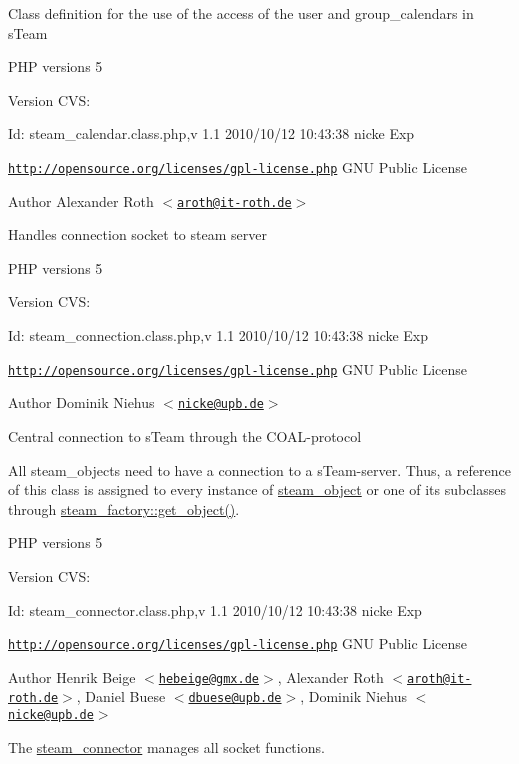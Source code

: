 Class definition for the use of the access of the user and group\_\-calendars in sTeam

PHP versions 5

\begin{DoxyVersion}{Version}
CVS: 
\end{DoxyVersion}
\begin{DoxyParagraph}{Id:}
steam\_\-calendar.class.php,v 1.1 2010/10/12 10:43:38 nicke Exp 
\end{DoxyParagraph}


\href{http://opensource.org/licenses/gpl-license.php}{\tt http://opensource.org/licenses/gpl-\/license.php} GNU Public License \begin{DoxyAuthor}{Author}
Alexander Roth $<$\href{mailto:aroth@it-roth.de}{\tt aroth@it-\/roth.de}$>$
\end{DoxyAuthor}
Handles connection socket to steam server

PHP versions 5

\begin{DoxyVersion}{Version}
CVS: 
\end{DoxyVersion}
\begin{DoxyParagraph}{Id:}
steam\_\-connection.class.php,v 1.1 2010/10/12 10:43:38 nicke Exp 
\end{DoxyParagraph}


\href{http://opensource.org/licenses/gpl-license.php}{\tt http://opensource.org/licenses/gpl-\/license.php} GNU Public License \begin{DoxyAuthor}{Author}
Dominik Niehus $<$\href{mailto:nicke@upb.de}{\tt nicke@upb.de}$>$
\end{DoxyAuthor}
Central connection to sTeam through the COAL-\/protocol

All steam\_\-objects need to have a connection to a sTeam-\/server. Thus, a reference of this class is assigned to every instance of \hyperlink{classsteam__object}{steam\_\-object} or one of its subclasses through \hyperlink{classsteam__factory_a43bb6293c515140481c39348305a029b}{steam\_\-factory::get\_\-object()}.

PHP versions 5

\begin{DoxyVersion}{Version}
CVS: 
\end{DoxyVersion}
\begin{DoxyParagraph}{Id:}
steam\_\-connector.class.php,v 1.1 2010/10/12 10:43:38 nicke Exp 
\end{DoxyParagraph}


\href{http://opensource.org/licenses/gpl-license.php}{\tt http://opensource.org/licenses/gpl-\/license.php} GNU Public License \begin{DoxyAuthor}{Author}
Henrik Beige $<$\href{mailto:hebeige@gmx.de}{\tt hebeige@gmx.de}$>$, Alexander Roth $<$\href{mailto:aroth@it-roth.de}{\tt aroth@it-\/roth.de}$>$, Daniel Buese $<$\href{mailto:dbuese@upb.de}{\tt dbuese@upb.de}$>$, Dominik Niehus $<$\href{mailto:nicke@upb.de}{\tt nicke@upb.de}$>$
\end{DoxyAuthor}
The \hyperlink{classsteam__connector}{steam\_\-connector} manages all socket functions.

